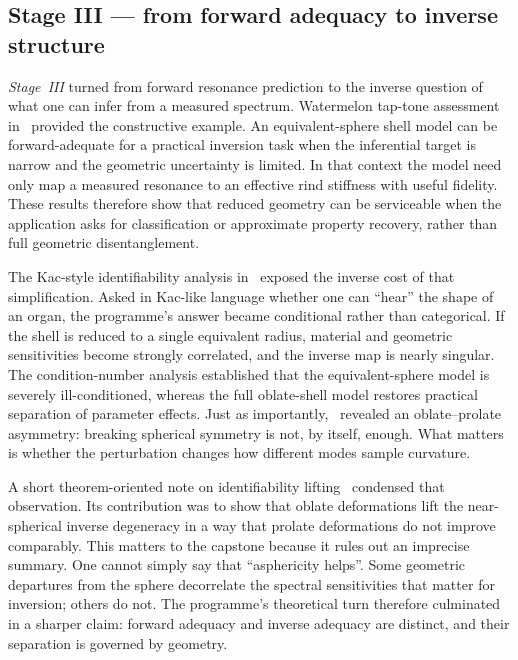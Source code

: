 \subsection{Stage III --- from forward adequacy to inverse structure}

\emph{Stage~III} turned from forward resonance prediction to the inverse question
of what one can infer from a measured spectrum.  Watermelon tap-tone assessment
in~\cite{BrowntoneP7} provided the constructive example.  An equivalent-sphere
shell model can be forward-adequate for a
practical inversion task when the inferential target is narrow and the
geometric uncertainty is limited.  In that context the model need only map a
measured resonance to an effective rind stiffness with useful fidelity.  These
results therefore show that reduced geometry can be serviceable
when the application asks for classification or approximate property recovery,
rather than full geometric disentanglement.

The Kac-style identifiability analysis in~\cite{BrowntoneP8} exposed the
inverse cost of that simplification.
Asked in Kac-like language whether one can ``hear'' the shape of an organ, the
programme's answer became conditional rather than categorical.  If the shell is
reduced to a single equivalent radius, material and geometric sensitivities
become strongly correlated, and the inverse map is nearly singular.  The
condition-number analysis established that the equivalent-sphere model is
severely ill-conditioned, whereas the full oblate-shell model restores
practical separation of parameter effects.  Just as importantly,~\cite{BrowntoneP8}
revealed an oblate--prolate asymmetry: breaking spherical symmetry is not, by
itself, enough.  What matters is whether the perturbation changes how different
modes sample curvature.

A short theorem-oriented note on identifiability lifting~\cite{BrowntoneP9}
condensed that observation.  Its contribution was to show that
oblate deformations lift the near-spherical inverse degeneracy in a way that
prolate deformations do not improve comparably.  This matters to the capstone
because it rules out an imprecise summary.  One cannot simply say that
``asphericity helps''.  Some geometric departures from the sphere decorrelate
the spectral sensitivities that matter for inversion; others do not.  The
programme's theoretical turn therefore culminated in a sharper claim:
forward adequacy and inverse adequacy are distinct, and their separation is
governed by geometry.

